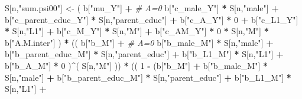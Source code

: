 \documentclass[
]{book}
\newenvironment{Shaded}{\begin{snugshade}}{\end{snugshade}}
\newcommand{\CommentTok}[1]{\textcolor[rgb]{0.56,0.35,0.01}{\textit{#1}}}
\newcommand{\DecValTok}[1]{\textcolor[rgb]{0.00,0.00,0.81}{#1}}
\newcommand{\NormalTok}[1]{#1}
\newcommand{\OtherTok}[1]{\textcolor[rgb]{0.56,0.35,0.01}{#1}}
\newcommand{\SpecialCharTok}[1]{\textcolor[rgb]{0.81,0.36,0.00}{\textbf{#1}}}
\newcommand{\StringTok}[1]{\textcolor[rgb]{0.31,0.60,0.02}{#1}}
\begin{document}
\begin{Shaded}
\begin{Highlighting}[]
\NormalTok{    S[n,}\StringTok{"sum.psi00"}\NormalTok{] }\OtherTok{\textless{}{-}}\NormalTok{  ( b[}\StringTok{"mu\_Y"}\NormalTok{] }\SpecialCharTok{+}                                          \CommentTok{\# A=0}
\NormalTok{                             b[}\StringTok{"c\_male\_Y"}\NormalTok{] }\SpecialCharTok{*}\NormalTok{ S[n,}\StringTok{"male"}\NormalTok{] }\SpecialCharTok{+} 
\NormalTok{                             b[}\StringTok{"c\_parent\_educ\_Y"}\NormalTok{] }\SpecialCharTok{*}\NormalTok{ S[n,}\StringTok{"parent\_educ"}\NormalTok{] }\SpecialCharTok{+} 
\NormalTok{                             b[}\StringTok{"c\_A\_Y"}\NormalTok{] }\SpecialCharTok{*} \DecValTok{0} \SpecialCharTok{+} 
\NormalTok{                             b[}\StringTok{"c\_L1\_Y"}\NormalTok{] }\SpecialCharTok{*}\NormalTok{ S[n,}\StringTok{"L1"}\NormalTok{] }\SpecialCharTok{+}
\NormalTok{                             b[}\StringTok{"c\_M\_Y"}\NormalTok{] }\SpecialCharTok{*}\NormalTok{ S[n,}\StringTok{"M"}\NormalTok{] }\SpecialCharTok{+}
\NormalTok{                             b[}\StringTok{"c\_AM\_Y"}\NormalTok{] }\SpecialCharTok{*} \DecValTok{0} \SpecialCharTok{*}\NormalTok{ S[n,}\StringTok{"M"}\NormalTok{] }\SpecialCharTok{*}\NormalTok{ b[}\StringTok{"A.M.inter"}\NormalTok{] ) }\SpecialCharTok{*}
\NormalTok{      (( b[}\StringTok{"b\_M"}\NormalTok{] }\SpecialCharTok{+}                                                             \CommentTok{\# A\textquotesingle{}=0}
\NormalTok{           b[}\StringTok{"b\_male\_M"}\NormalTok{] }\SpecialCharTok{*}\NormalTok{ S[n,}\StringTok{"male"}\NormalTok{] }\SpecialCharTok{+} 
\NormalTok{           b[}\StringTok{"b\_parent\_educ\_M"}\NormalTok{] }\SpecialCharTok{*}\NormalTok{ S[n,}\StringTok{"parent\_educ"}\NormalTok{] }\SpecialCharTok{+} 
\NormalTok{           b[}\StringTok{"b\_L1\_M"}\NormalTok{] }\SpecialCharTok{*}\NormalTok{ S[n,}\StringTok{"L1"}\NormalTok{] }\SpecialCharTok{+}
\NormalTok{           b[}\StringTok{"b\_A\_M"}\NormalTok{] }\SpecialCharTok{*} \DecValTok{0}\NormalTok{ )}\SpecialCharTok{\^{}}\NormalTok{( S[n,}\StringTok{"M"}\NormalTok{] )) }\SpecialCharTok{*}
\NormalTok{      (( }\DecValTok{1} \SpecialCharTok{{-}}\NormalTok{ (b[}\StringTok{"b\_M"}\NormalTok{] }\SpecialCharTok{+} 
\NormalTok{                b[}\StringTok{"b\_male\_M"}\NormalTok{] }\SpecialCharTok{*}\NormalTok{ S[n,}\StringTok{"male"}\NormalTok{] }\SpecialCharTok{+} 
\NormalTok{                b[}\StringTok{"b\_parent\_educ\_M"}\NormalTok{] }\SpecialCharTok{*}\NormalTok{ S[n,}\StringTok{"parent\_educ"}\NormalTok{] }\SpecialCharTok{+} 
\NormalTok{                b[}\StringTok{"b\_L1\_M"}\NormalTok{] }\SpecialCharTok{*}\NormalTok{ S[n,}\StringTok{"L1"}\NormalTok{] }\SpecialCharTok{+}

\end{Highlighting}
\end{Shaded}
\end{document}
